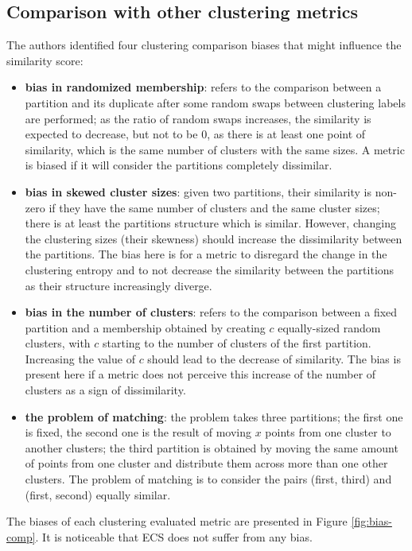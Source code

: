     \subsection{Comparison with other clustering metrics}
    The authors identified four clustering comparison biases that might influence the similarity score:
    \begin{itemize}
        \item \textbf{bias in randomized membership}: refers to the comparison between a partition and its duplicate after some random swaps between clustering labels are performed; as the ratio of random swaps increases, the similarity is expected to decrease, but not to be 0, as there is at least one point of similarity, which is the same number of clusters with the same sizes. A metric is biased if it will consider the partitions completely dissimilar.
        \item \textbf{bias in skewed cluster sizes}: given two partitions, their similarity is non-zero if they have the same number of clusters and the same cluster sizes; there is at least the partitions structure which is similar. However, changing the clustering sizes (their skewness) should increase the dissimilarity between the partitions. The bias here is for a metric to disregard the change in the clustering entropy and to not decrease the similarity between the partitions as their structure increasingly diverge.
        \item \textbf{bias in the number of clusters}: refers to the comparison between a fixed partition and a membership obtained by creating $c$ equally-sized random clusters, with $c$ starting to the number of clusters of the first partition. Increasing the value of $c$ should lead to the decrease of similarity. The bias is present here if a metric does not perceive this increase of the number of clusters as a sign of dissimilarity.
        \item \textbf{the problem of matching}: the problem takes three partitions; the first one is fixed, the second one is the result of moving $x$ points from one cluster to another clusters; the third partition is obtained by moving the same amount of points from one cluster and distribute them across more than one other clusters. The problem of matching is to consider the pairs (first, third) and (first, second) equally similar.
    \end{itemize}
    
    The biases of each clustering evaluated metric are presented in Figure \ref{fig:bias-comp}. It is noticeable that ECS does not suffer from any bias.
    
